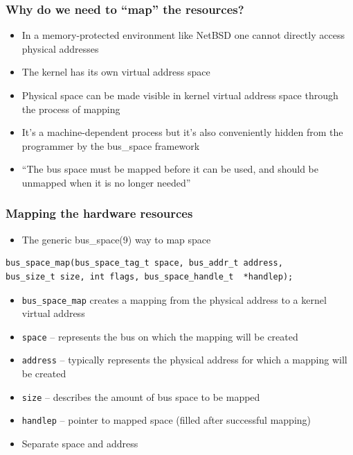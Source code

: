 \documentclass[dvipsnames,table]{beamer}
\begin{document}
\begin{frame}
\frametitle{Why do we need to ``map'' the resources?}
\begin{itemize}
	\item In a memory-protected environment like NetBSD one cannot directly access physical addresses
	\item The kernel has its own virtual address space
	\item Physical space can be made visible in kernel virtual address space through the process of mapping
	\item It's a machine-dependent process but it's also conveniently hidden from the programmer by the bus\_space framework
	\item ``The bus space must be mapped before it can be used, and should be unmapped       when it is no longer needed''
\end{itemize}
\end{frame}


\begin{frame}[fragile]
\frametitle{Mapping the hardware resources}

\begin{itemize}
	\item The generic bus\_space(9) way to map space
\end{itemize}

\begin{verbatim}
bus_space_map(bus_space_tag_t space, bus_addr_t address, 
bus_size_t size, int flags, bus_space_handle_t  *handlep);
\end{verbatim}

\begin{itemize}
	\item {\tt bus\_space\_map} creates a mapping from the physical address to a kernel virtual address
    \item {\tt space} -- represents the bus on which the mapping will be created
    \item {\tt address} -- typically represents the physical address for which a mapping will be created
	\item {\tt size} -- describes the amount of bus space to be mapped
	\item {\tt handlep} -- pointer to mapped space (filled after successful mapping)
    \item Separate space and address
\end{itemize}
\end{frame}
\end{document}
